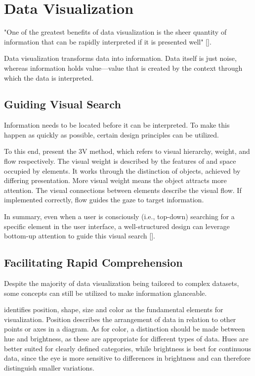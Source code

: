 \section{Data Visualization}
\label{sec:datavis}

"One of the greatest benefits of data visualization is the sheer quantity of information that can be rapidly interpreted if it is presented well" [\cite{wareChapterOneFoundations2013}].

Data visualization transforms data into information. Data itself is just noise, whereas information holds value—value that is created by the context through which the data is interpreted.

\subsection{Guiding Visual Search}

Information needs to be located before it can be interpreted. To make this happen as quickly as possible, certain design principles can be utilized.

To this end, \textcite{shaoHowDynamicInformation2023} present the 3V method, which refers to visual hierarchy, weight, and flow respectively.
The visual weight is described by the features of and space occupied by elements. It works through the distinction of objects, achieved by differing presentation. More visual weight means the object attracts more attention.
The visual connections between elements describe the visual flow. If implemented correctly, flow guides the gaze to target information.

In summary, even when a user is consciously (i.e., top-down) searching for a specific element in the user interface, a well-structured design can leverage bottom-up attention to guide this visual search [\cite{shaoHowDynamicInformation2023}].

\subsection{Facilitating Rapid Comprehension}

Despite the majority of data visualization being tailored to complex datasets, some concepts can still be utilized to make information glanceable.

\textcite{wilke2VisualizingData2019} identifies position, shape, size and color as the fundamental elements for visualization. Position describes the arrangement of data in relation to other points or axes in a diagram. As for color, a distinction should be made between hue and brightness, as these are appropriate for different types of data. Hues are better suited for clearly defined categories, while brightness is best for continuous data, since the eye is more sensitive to differences in brightness and can therefore distinguish smaller variations.

